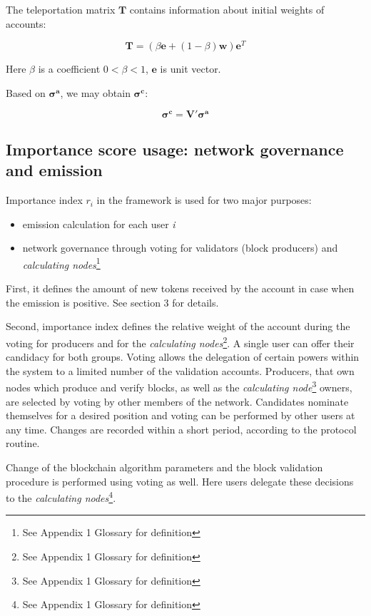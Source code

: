 \documentclass[a4paper,12pt]{article}
\begin{document}
	The teleportation matrix $\boldsymbol{T}$ contains information about initial weights of accounts:
	
	$$
	\boldsymbol{T} = (\beta \boldsymbol{e} + (1 - \beta) \boldsymbol{w}) \boldsymbol{e}^T
	$$
	
	Here $\beta$ is a coefficient $0 < \beta < 1$, $\boldsymbol{e}$ is unit vector.
	
	Based on $\boldsymbol{\sigma^a}$, we may obtain $\boldsymbol{\sigma^c}$:
	
	$$
	\boldsymbol{\sigma^c} = \boldsymbol{V'}\boldsymbol{\sigma^a}
	$$
	
	
	
\subsection{Importance score usage: network governance and emission}

Importance index $r_i$ in the framework is used for two major purposes:
\begin{itemize}
\item emission calculation for each user \textit{i}
\item  network governance through voting for validators (block producers) and \emph{calculating nodes}\footnote{See Appendix 1 Glossary for definition}
\end{itemize}


First, it defines the amount of new tokens received by the account in case when the emission is positive.  See section 3 for details.

Second, importance index defines the relative weight of the account during the voting for producers and for the \emph{calculating nodes}\footnote{See Appendix 1 Glossary for definition}. A single user can offer their candidacy for both groups. Voting allows the delegation of certain powers within the system to a limited number of the validation accounts. Producers, that own nodes which produce and verify blocks, as well as the \emph{calculating node}\footnote{See Appendix 1 Glossary for definition} owners, are selected by voting by other members of the network. Candidates nominate themselves for a desired position and voting can be performed by other users at any time. Changes are recorded within a short period, according to the protocol routine.

Change of the blockchain algorithm parameters and the block validation procedure is performed using voting as well. Here users delegate these decisions to the \emph{calculating nodes}\footnote{See Appendix 1 Glossary for definition}.
\end{document}
